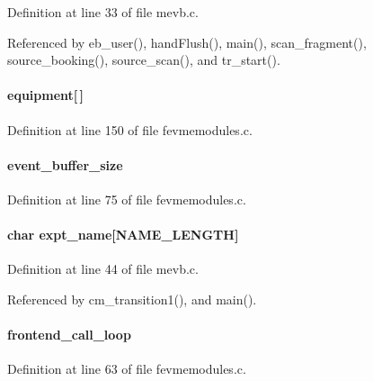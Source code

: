 Definition at line 33 of file mevb.c.

Referenced by eb\_\-user(), handFlush(), main(), scan\_\-fragment(), source\_\-booking(), source\_\-scan(), and tr\_\-start().
\paragraph[{equipment}]{ {\bf equipment}\mbox{[}$\,$\mbox{]}}\hfill\label{mevb_8c_aa86ef8764826784b74603ffb23852283}


Definition at line 150 of file fevmemodules.c.
\paragraph[{event\_\-buffer\_\-size}]{ {\bf event\_\-buffer\_\-size}}\hfill\label{mevb_8c_a4411d7db6f901c968b946ed659d202f6}


Definition at line 75 of file fevmemodules.c.
\paragraph[{expt\_\-name}]{\setlength{\rightskip}{0pt plus 5cm}char {\bf expt\_\-name}\mbox{[}NAME\_\-LENGTH\mbox{]}}\hfill\label{mevb_8c_a72ed5035970a7c95a9a3e9faeb64cc1c}


Definition at line 44 of file mevb.c.

Referenced by cm\_\-transition1(), and main().
\paragraph[{frontend\_\-call\_\-loop}]{ {\bf frontend\_\-call\_\-loop}}\hfill\label{mevb_8c_a0215c0a842a0e97fe65c7ef5fb7633a5}


Definition at line 63 of file fevmemodules.c.

